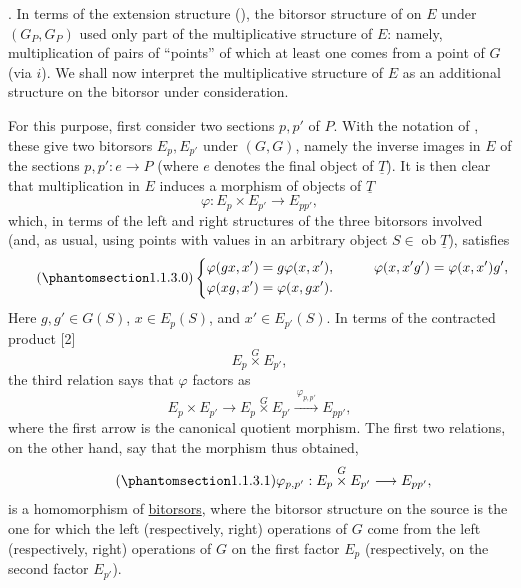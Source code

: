 
. In terms of the extension structure (), the bitorsor
structure of  on $E$ under $(G_P,G_P)$ used only part of the
multiplicative structure of $E$: namely, multiplication of pairs of
``points'' of which at least one comes from a point of $G$ (via $i$). We
shall now interpret the multiplicative structure of $E$ as an additional
structure on the bitorsor under consideration.


For this purpose, first consider two sections $p,p'$ of $P$. With the
notation of , these give two bitorsors $E_p,E_{p'}$ under $(G,G)$,
namely the inverse images in $E$ of the sections
$p,p':e\longrightarrow P$ (where $e$ denotes the final object of
$\underline T$). It is then clear that multiplication in $E$ induces a
morphism of objects of $\underline T$
\[
 \varphi:E_p\times E_{p'}\longrightarrow E_{pp'},
\]
which, in terms of the left and right structures of the three bitorsors
involved (and, as usual, using points with values in an arbitrary object
$S\in\operatorname{ob}\underline T$), satisfies
\begin{equation}\tag{\SGARefTarget{sga7.sga7i.evii.n1-1-3-0}{1.1.3.0}}
\left\{
\begin{aligned}
 \varphi(gx,x')&=g\varphi(x,x'),
 &\qquad \varphi(x,x'g')&=\varphi(x,x')g',\\
 \varphi(xg,x')&=\varphi(x,gx').
\end{aligned}
\right.
\end{equation}
Here $g,g'\in G(S)$, $x\in E_p(S)$, and $x'\in E_{p'}(S)$. In terms of
the contracted product [2]
\[
 E_p\mathbin{\overset{G}{\times}}E_{p'},
\]
the third relation says that $\varphi$ factors as
\[
 E_p\times E_{p'}\longrightarrow
 E_p\mathbin{\overset{G}{\times}}E_{p'}
 \xrightarrow{\ \varphi_{p,p'}\ }E_{pp'},
\]
where the first arrow is the canonical quotient morphism. The first two
relations, on the other hand, say that the morphism thus obtained,
\begin{equation}\tag{\SGARefTarget{sga7.sga7i.evii.n1-1-3-1}{1.1.3.1}}
 \varphi_{p,p'}:
 E_p\mathbin{\overset{G}{\times}}E_{p'}\longrightarrow E_{pp'},
\end{equation}
is a homomorphism of \underline{bitorsors}, where the bitorsor structure
on the source is the one for which the left (respectively, right)
operations of $G$ come from the left (respectively, right) operations of
$G$ on the first factor $E_p$ (respectively, on the second factor
$E_{p'}$).


